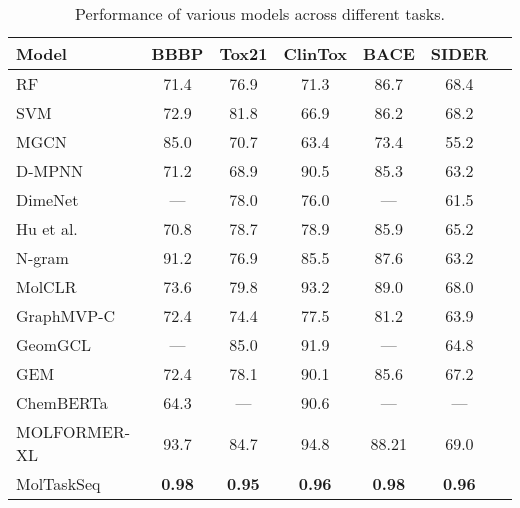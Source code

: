 \begin{table}[ht]
    \centering
    \begin{tabular}{|l|c|c|c|c|c|c|}
    \hline
    Model                                & BBBP        & Tox21       & ClinTox     & BACE        & SIDER       \\ \hline
    RF                                   & 71.4        & 76.9        & 71.3        & 86.7        & 68.4        \\ \hline
    SVM                                  & 72.9        & 81.8        & 66.9        & 86.2        & 68.2        \\ \hline
    MGCN \cite{molformer_56}             & 85.0        & 70.7        & 63.4        & 73.4        & 55.2        \\ \hline
    D-MPNN \cite{molformer_57}           & 71.2        & 68.9        & 90.5        & 85.3        & 63.2        \\ \hline
    DimeNet \cite{molformer_37}          & —           & 78.0        & 76.0        & —           & 61.5        \\ \hline
    Hu et al. \cite{molformer_32}        & 70.8        & 78.7        & 78.9        & 85.9        & 65.2        \\ \hline
    N-gram \cite{molformer_33}           & 91.2        & 76.9        & 85.5        & 87.6        & 63.2        \\ \hline
    MolCLR \cite{molformer_26}           & 73.6        & 79.8        & 93.2        & 89.0        & 68.0        \\ \hline
    GraphMVP-C \cite{molformer_26}       & 72.4        & 74.4        & 77.5        & 81.2        & 63.9        \\ \hline
    GeomGCL \cite{molformer_36}          & —           & 85.0        & 91.9        & —           & 64.8        \\ \hline
    GEM \cite{molformer_36}              & 72.4        & 78.1        & 90.1        & 85.6        & 67.2        \\ \hline
    ChemBERTa \cite{molformer_38}        & 64.3        & —           & 90.6        & —           & —           \\ \hline
    MOLFORMER-XL \cite{molformer_25}     & 93.7        & 84.7        & 94.8        & 88.21       & 69.0        \\ \hline
    MolTaskSeq                           & \textbf{0.98} & \textbf{0.95} & \textbf{0.96} & \textbf{0.98} & \textbf{0.96} \\ \hline
    \end{tabular}
    \caption{Performance of various models across different tasks.}
    \label{tab:model_performance}
\end{table}
